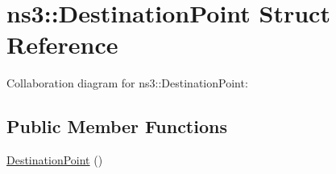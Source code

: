 \hypertarget{structns3_1_1DestinationPoint}{}\section{ns3\+:\+:Destination\+Point Struct Reference}
\label{structns3_1_1DestinationPoint}


Collaboration diagram for ns3\+:\+:Destination\+Point\+:
\subsection*{Public Member Functions}
\begin{DoxyCompactItemize}
\item 
\hyperlink{structns3_1_1DestinationPoint_a1e77229e5df85cf5db3829dcab826779}{Destination\+Point} ()
\end{DoxyCompactItemize}
